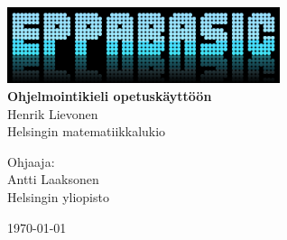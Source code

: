 \begin{titlepage}
	\begin{center}
		\vspace*{\fill}
	
		\includegraphics[width=0.6\textwidth]{logo}~\\[1cm]
		
		{\huge \bfseries Ohjelmointikieli opetuskäyttöön} \\[0.4cm]
		
		{\Large Henrik Lievonen\\
		Helsingin matematiikkalukio}
		
		{\large Ohjaaja:\\
		Antti Laaksonen\\
		Helsingin yliopisto}
		
		{\large \today}
		
		\vfill		
	\end{center}
\end{titlepage}